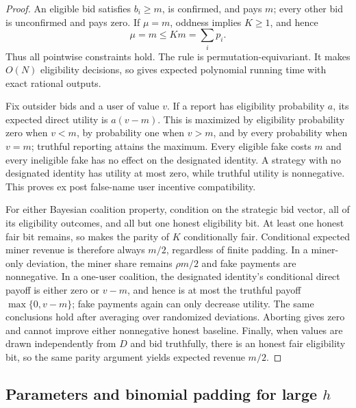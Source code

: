 \documentclass[11pt]{article}
\begin{document}
\begin{proof}
An eligible bid satisfies $b_i\ge m$, is confirmed, and pays $m$; every other
bid is unconfirmed and pays zero.  If $\mu=m$, oddness implies $K\ge1$, and
hence
\[
\mu=m\le Km=\sum_i p_i.
\]
Thus all pointwise constraints hold.  The rule is permutation-equivariant.
It makes $O(N)$ eligibility decisions, so  gives
expected polynomial running time with exact rational outputs.

Fix outsider bids and a user of value $v$.  If a report has eligibility
probability $a$, its expected direct utility is $a(v-m)$.  This is maximized by
eligibility probability zero when $v<m$, by probability one when $v>m$, and
by every probability when $v=m$; truthful reporting attains the maximum.
Every eligible fake costs $m$ and every ineligible fake has no effect on the
designated identity.  A strategy with no designated identity has utility at
most zero, while truthful utility is nonnegative.  This proves ex post
false-name user incentive compatibility.

For either Bayesian coalition property, condition on the strategic bid vector,
all of its eligibility outcomes, and all but one honest eligibility bit.  At
least one honest fair bit remains, so  makes the
parity of $K$ conditionally fair.  Conditional expected miner revenue is
therefore always $m/2$, regardless of finite padding.  In a miner-only
deviation, the miner share remains $\rho m/2$ and fake payments are
nonnegative.  In a one-user coalition, the designated identity's conditional
direct payoff is either zero or $v-m$, and hence is at most the truthful
payoff $\max\{0,v-m\}$; fake payments again can only decrease utility.  The
same conclusions hold after averaging over randomized deviations.  Aborting
gives zero and cannot improve either nonnegative honest baseline.  Finally,
when values are drawn independently from $D$ and bid truthfully, there is an
honest fair eligibility bit, so the same parity argument yields expected
revenue $m/2$.
\end{proof}

\subsection{Parameters and binomial padding for large \texorpdfstring{$h$}{h}}
\end{document}
